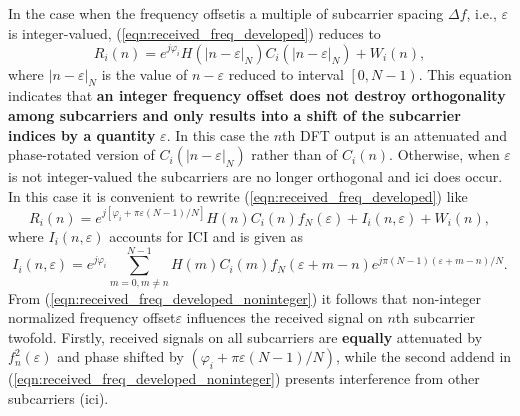 In the case when the frequency offsetis a multiple of subcarrier spacing $\Delta f$, i.e., $\varepsilon$ is integer-valued, (\ref{eqn:received_freq_developed}) reduces to
%
\begin{equation}
\label{eqn:received_freq_developed_integer}
R_i(n)=e^{j\varphi_i} H({|n-\varepsilon|}_N)C_i({|n-\varepsilon|}_N) +W_i(n),
\end{equation}
%
where ${|n-\varepsilon|}_N$ is the value of $n-\varepsilon$ reduced to interval $\left[ 0,N-1\right)$. This equation indicates that \textbf{an integer frequency offset does not destroy orthogonality among subcarriers and only results into a shift of the subcarrier indices by a quantity} $\varepsilon$. In this case the $n$th DFT output is an attenuated and phase-rotated version of $C_i({|n-\varepsilon|}_N)$ rather than of $C_i(n)$. Otherwise, when $\varepsilon$ is not integer-valued the subcarriers are no longer orthogonal and \gls{ici} does occur. In this case it is convenient to rewrite (\ref{eqn:received_freq_developed}) like
%
\begin{equation}
\label{eqn:received_freq_developed_noninteger}
R_i(n)=e^{j\left[ \varphi_i + \pi\varepsilon (N-1)/N\right] } H(n)C_i(n)f_N(\varepsilon) + I_i(n,\varepsilon) +W_i(n),
\end{equation}
%
where $I_i(n,\varepsilon)$ accounts for ICI and is given as
%
\begin{equation}
\label{eqn:Ii}
I_i(n,\varepsilon)=e^{j\varphi_i} \sum_{m=0,m \neq n}^{N-1} H(m) C_i(m)f_N(\varepsilon + m - n)e^{j\pi (N-1)(\varepsilon +m - n)/N}.
\end{equation}
%
From (\ref{eqn:received_freq_developed_noninteger}) it follows that non-integer normalized frequency offset$\varepsilon$ influences the received signal on $n$th subcarrier twofold.
Firstly, received signals on all subcarriers are \textbf{equally} attenuated by $f_n^2(\varepsilon)$ and phase shifted by $(\varphi_i + \pi\varepsilon (N-1)/N)$, while the second addend in (\ref{eqn:received_freq_developed_noninteger}) presents interference from other subcarriers (\gls{ici}).

